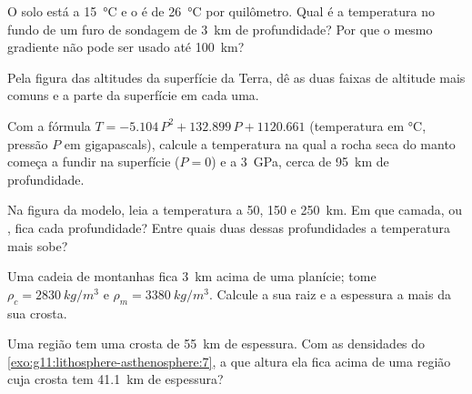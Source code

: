 \begin{exercise}[$\star$]\label{exo:g11:lithosphere-asthenosphere:3}
O solo está a \qty{15}{\celsius} e o  é de
\qty{26}{\celsius} por quilômetro. Qual é a temperatura no fundo de um furo
de sondagem de \qty{3}{km} de profundidade? Por que o mesmo gradiente não
pode ser usado até \qty{100}{km}?
\end{exercise}

\begin{exercise}[$\star$]\label{exo:g11:lithosphere-asthenosphere:4}
Pela figura das altitudes da superfície da Terra, dê as duas faixas de
altitude mais comuns e a parte da superfície em cada uma.
\end{exercise}

\begin{exercise}[$\star$]\label{exo:g11:lithosphere-asthenosphere:5}
Com a fórmula $T = -5.104\,P^2 + 132.899\,P + 1120.661$ (temperatura em
\unit{\celsius}, pressão $P$ em gigapascals), calcule a temperatura na qual
a rocha seca do manto começa a fundir na superfície ($P = 0$) e a
\qty{3}{GPa}, cerca de \qty{95}{km} de profundidade.
\end{exercise}

\begin{exercise}[$\star\star$]\label{exo:g11:lithosphere-asthenosphere:6}
Na figura da  modelo, leia a temperatura a 50, 150 e
\qty{250}{km}. Em que camada,  ou , fica cada
profundidade? Entre quais duas dessas profundidades a temperatura mais
sobe?
\end{exercise}

\begin{exercise}[$\star\star$]\label{exo:g11:lithosphere-asthenosphere:7}
Uma cadeia de montanhas fica \qty{3}{km} acima de uma planície; tome $\rho_c =
\qty{2830}{kg/m^3}$ e $\rho_m = \qty{3380}{kg/m^3}$. Calcule a sua raiz e a
espessura a mais da sua crosta.
\end{exercise}

\begin{exercise}[$\star\star$]\label{exo:g11:lithosphere-asthenosphere:8}
Uma região tem uma crosta de \qty{55}{km} de espessura. Com as densidades do
\cref{exo:g11:lithosphere-asthenosphere:7}, a que altura ela fica acima de
uma região cuja crosta tem \qty{41.1}{km} de espessura?
\end{exercise}

